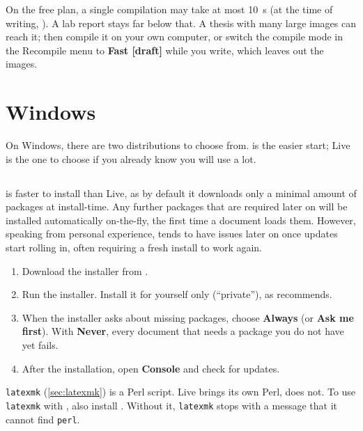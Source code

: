 On the free plan, a single compilation may take at most \qty{10}{\second}
(at the time of writing, \cite{overleaf-limits}).
A lab report stays far below that.
A thesis with many large images can reach it;
then compile it on your own computer,
or switch the compile mode in the Recompile menu to \textbf{Fast [draft]} while you write,
which leaves out the images.

\section{Windows}\label{sec:windows}

On Windows, there are two distributions to choose from.
 is the easier start;
 Live is the one to choose if you already know you will use  a lot.

\subsection{}\label{sec:miktex}

 is faster to install than  Live, as by default it downloads only a minimal amount of packages at install-time.
Any further packages that are required later on will be installed automatically on-the-fly,
the first time a document loads them.
However, speaking from personal experience,  tends to have issues later on once updates start rolling in, often requiring a fresh install to work again.

\begin{enumerate}
    \item Download the installer from .
    \item Run the installer.
        Install it for yourself only (\enquote{private}), as  recommends.
    \item When the installer asks about missing packages, choose \textbf{Always} (or \textbf{Ask me first}).
        With \textbf{Never}, every document that needs a package you do not have yet fails.
    \item After the installation, open \textbf{ Console} and check for updates.
\end{enumerate}

\texttt{latexmk} (\autoref{sec:latexmk}) is a Perl script.
 Live brings its own Perl,  does not.
To use \texttt{latexmk} with , also install
.
Without it, \texttt{latexmk} stops with a message that it cannot find \texttt{perl}.

